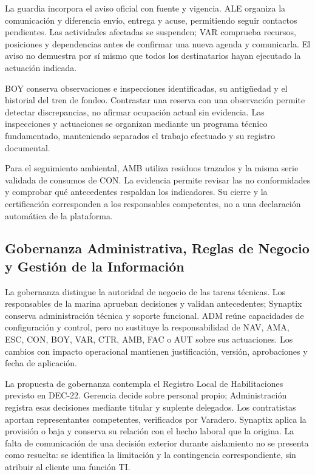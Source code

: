 La guardia incorpora el aviso oficial con fuente
y vigencia. ALE organiza la comunicación y diferencia
envío, entrega y acuse, permitiendo seguir contactos
pendientes. Las actividades afectadas se suspenden;
VAR comprueba recursos, posiciones y dependencias
antes de confirmar una nueva agenda y comunicarla.
El aviso no demuestra por sí mismo que todos
los destinatarios hayan ejecutado la actuación indicada.

BOY conserva observaciones e inspecciones identificadas,
su antigüedad y el historial del tren de fondeo.
Contrastar una reserva con una observación permite
detectar discrepancias, no afirmar ocupación actual
sin evidencia. Las inspecciones y actuaciones
se organizan mediante un programa técnico fundamentado,
manteniendo separados el trabajo efectuado
y su registro documental.

Para el seguimiento ambiental, AMB utiliza residuos
trazados y la misma serie validada de consumos de CON.
La evidencia permite revisar las no conformidades
y comprobar qué antecedentes respaldan los indicadores.
Su cierre y la certificación corresponden a
los responsables competentes, no a una declaración
automática de la plataforma.

\subsection{Gobernanza Administrativa, Reglas de Negocio y Gestión de la Información}

La gobernanza distingue la autoridad de negocio de las
tareas técnicas. Los responsables de la marina aprueban
decisiones y validan antecedentes; Synaptix conserva
administración técnica y soporte funcional. ADM reúne
capacidades de configuración y control, pero no sustituye la responsabilidad de NAV, AMA, ESC, CON, BOY, VAR,
CTR, AMB, FAC o AUT sobre sus actuaciones. Los cambios
con impacto operacional mantienen justificación,
versión, aprobaciones y fecha de aplicación.

La propuesta de gobernanza contempla el Registro Local
de Habilitaciones previsto en DEC-22. Gerencia decide
sobre personal propio; Administración registra esas
decisiones mediante titular y suplente delegados.
Los contratistas aportan representantes competentes,
verificados por Varadero. Synaptix aplica la provisión
o baja y conserva su relación con el hecho laboral
que la origina. La falta de comunicación de una decisión exterior durante aislamiento no se presenta como resuelta: se identifica la limitación y la contingencia correspondiente, sin atribuir al cliente una función TI.

